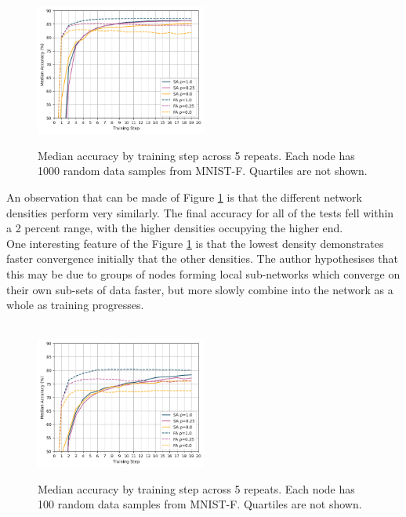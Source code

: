 \documentclass[letterpaper, 10 pt, conference]{ieeeconf}  %
\begin{document}
\begin{figure}[H]
	 \\
	\includegraphics[width=0.5\textwidth]{conf_sparse_ns1000}
	\caption{Median accuracy by training step across 5 repeats. Each node has 1000 random data samples from MNIST-F. Quartiles are not shown.}
	\label{aeg4}
\end{figure}

An observation that can be made of Figure \ref{aeg4} is that the different network densities perform very similarly. The final accuracy for all of the tests fell within a 2 percent range,  with the higher densities occupying the higher end. \\

One interesting feature of the Figure \ref{aeg4} is that the lowest density demonstrates faster convergence initially that the other densities. The author hypothesises that this may be due to groups of nodes forming local sub-networks which converge on their own sub-sets of data faster, but more slowly combine into the network as a whole as training progresses.

\begin{figure}[H] 
	 \\
	\includegraphics[width=0.5\textwidth]{conf_sparse_ns100}
	\caption{Median accuracy by training step across 5 repeats. Each node has 100 random data samples from MNIST-F. Quartiles are not shown.}
	\label{aeg5}
\end{figure}
\end{document}
